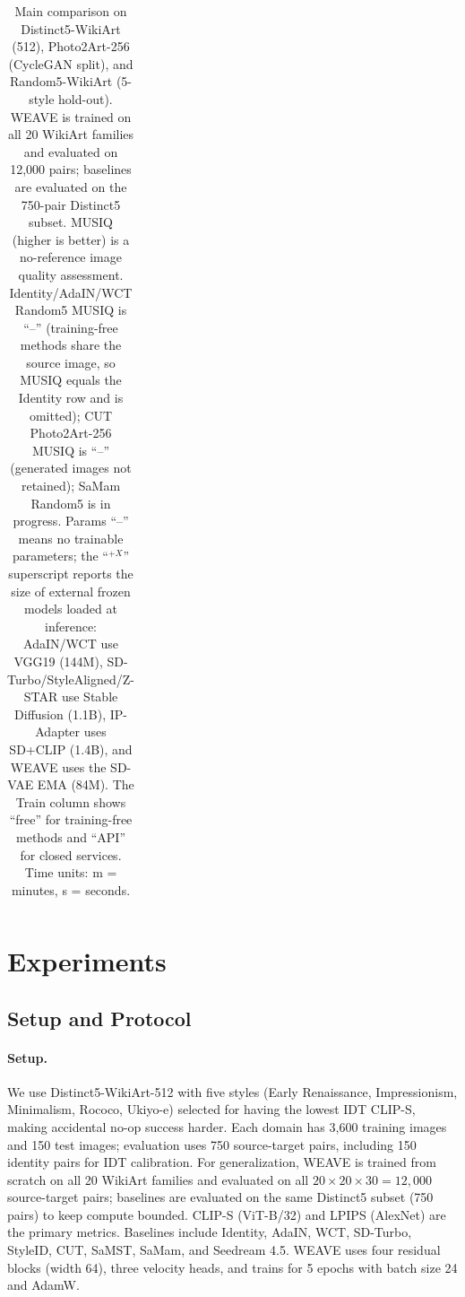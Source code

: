 \documentclass[letterpaper]{article}
\begin{document}
\begin{table}[t!]
\begin{tabular}{@{}lllcccccccccccc@{}}
\bottomrule
\end{tabular}
\caption{Main comparison on Distinct5-WikiArt (512), Photo2Art-256 (CycleGAN split), and Random5-WikiArt (5-style hold-out).
WEAVE is trained on all 20 WikiArt families and evaluated on 12{,}000 pairs; baselines are evaluated on the 750-pair Distinct5 subset.
MUSIQ (higher is better) is a no-reference image quality assessment.
Identity/AdaIN/WCT Random5 MUSIQ is ``--'' (training-free methods share the source image, so MUSIQ equals the Identity row and is omitted); CUT Photo2Art-256 MUSIQ is ``--'' (generated images not retained); SaMam Random5 is in progress.
Params ``--'' means no trainable parameters; the ``$^{+X}$'' superscript reports the size of external frozen models loaded at inference: AdaIN/WCT use VGG19 (144M), SD-Turbo/StyleAligned/Z-STAR use Stable Diffusion (1.1B), IP-Adapter uses SD+CLIP (1.4B), and WEAVE uses the SD-VAE EMA (84M).
The Train column shows ``free'' for training-free methods and ``API'' for closed services.
Time units: m = minutes, s = seconds.}
\label{tab:main}
\end{table}
\section{Experiments}
\label{sec:exp}

\subsection{Setup and Protocol}

\paragraph{Setup.}
We use Distinct5-WikiArt-512 with five styles (Early Renaissance, Impressionism, Minimalism, Rococo, Ukiyo-e) selected for having the lowest IDT CLIP-S, making accidental no-op success harder.
Each domain has 3{,}600 training images and 150 test images; evaluation uses 750 source-target pairs, including 150 identity pairs for IDT calibration.
For generalization, WEAVE is trained from scratch on all 20 WikiArt families and evaluated on all $20{\times}20{\times}30{=}12{,}000$ source-target pairs; baselines are evaluated on the same Distinct5 subset (750 pairs) to keep compute bounded.
CLIP-S (ViT-B/32) and LPIPS (AlexNet) are the primary metrics.
Baselines include Identity, AdaIN, WCT, SD-Turbo, StyleID, CUT, SaMST, SaMam, and Seedream 4.5.
WEAVE uses four residual blocks (width 64), three velocity heads, and trains for 5 epochs with batch size 24 and AdamW.
\end{document}
